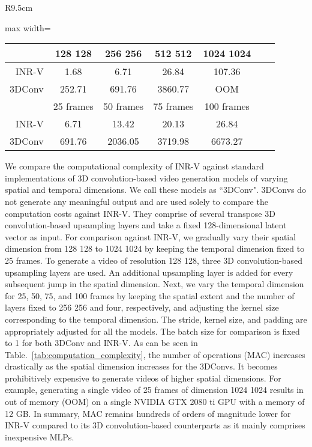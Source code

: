 \documentclass[10pt]{article} \usepackage[accepted]{tmlr}
\begin{document}
\begin{wraptable}[]{R}{9.5cm}
\vspace{-5pt}
\centering
\begin{adjustbox}{max width=\linewidth}
\begin{tabular}{r|cccccc}
\toprule  
& 128  128 & 256  256 & 512  512 & 1024  1024 
\\ \midrule
INR-V & 1.68 & 6.71 & 26.84 & 107.36 \\
3DConv & 252.71 & 691.76 & 3860.77 & OOM \\
\toprule
& 25 frames & 50 frames & 75 frames & 100 frames \\
\midrule
INR-V & 6.71 & 13.42 & 20.13 & 26.84 &  \\
3DConv & 691.76 & 2036.05 & 3719.98 & 6673.27 \\
\bottomrule
\end{tabular}
\end{adjustbox}
\caption{Comparison of computational complexity of INR-V against 3D convolutional-based video generative models for different spatial and temporal dimensions. The computational complexity is the total number of multiply-add Giga operations denoted by GMAC (Multiply-Add Cumulation).}
\label{tab:computation_complexity}

\end{wraptable}

We compare the computational complexity of INR-V against standard implementations of 3D convolution-based video generation models of varying spatial and temporal dimensions. We call these models as ``3DConv". 3DConvs do not generate any meaningful output and are used solely to compare the computation costs against INR-V. They comprise of several transpose 3D convolution-based upsampling layers and take a fixed 128-dimensional latent vector as input. For comparison against INR-V, we gradually vary their spatial dimension from 128  128 to 1024  1024 by keeping the temporal dimension fixed to 25 frames. To generate a video of resolution 128  128, three 3D convolution-based upsampling layers are used.
An additional upsampling layer is added for every subsequent jump in the spatial dimension. Next, we vary the temporal dimension for 25, 50, 75, and 100 frames by keeping the spatial extent and the number of layers fixed to 256  256 and four, respectively, and adjusting the kernel size corresponding to the temporal dimension. The stride, kernel size, and padding are appropriately adjusted for all the models. The batch size for comparison is fixed to 1 for both 3DConv and INR-V. As can be seen in Table.~\ref{tab:computation_complexity}, the number of operations (MAC) increases drastically as the spatial dimension increases for the 3DConvs. It becomes prohibitively expensive to generate videos of higher spatial dimensions. For example, generating a single video of 25 frames of dimension 1024  1024 results in out of memory (OOM) on a single NVIDIA GTX 2080 ti GPU with a memory of 12 GB. In summary, MAC remains hundreds of orders of magnitude lower for INR-V compared to its 3D convolution-based counterparts as it mainly comprises inexpensive MLPs.
\end{document}
